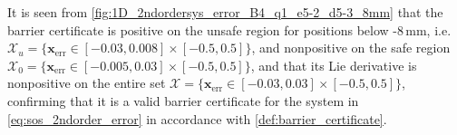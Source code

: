 




It is seen from \autoref{fig:1D_2ndordersys_error_B4_q1_e5-2_d5-3_8mm} that the barrier certificate is positive on the unsafe region for positions below -8\,mm, i.e. $\mathcal{X}_u=\{\mathbf{x}_\text{err}\in[-0.03,0.008]\times[-0.5,0.5]\}$, and nonpositive on the safe region $\mathcal{X}_0=\{\mathbf{x}_\text{err}\in[-0.005,0.03]\times[-0.5,0.5]\}$, and that its Lie derivative is nonpositive on the entire set $\mathcal{X}=\{\mathbf{x}_\text{err}\in[-0.03,0.03]\times[-0.5,0.5]\}$, confirming that it is a valid barrier certificate for the system in \autoref{eq:sos_2ndorder_error} in accordance with \autoref{def:barrier_certificate}.

